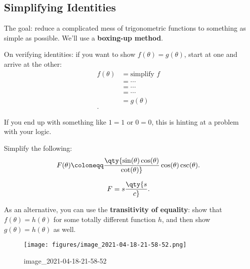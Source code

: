 \hypertarget{simplifying-identities}{%
\subsection{Simplifying Identities}\label{simplifying-identities}}

\begin{remark}

The goal: reduce a complicated mess of trigonometric functions to
something as simple as possible. We'll use a \textbf{boxing-up method}.

\end{remark}

\begin{remark}

On verifying identities: if you want to show \(f(\theta) = g(\theta)\),
start at one and arrive at the other:
\begin{align*}
f(\theta) &= \text{simplify } f \\
&= \cdots \\
&= \cdots \\
&= \cdots \\
&= g(\theta) \\
.\end{align*}

\end{remark}

\begin{warnings}

If you end up with something like \(1=1\) or \(0=0\), this is hinting at
a problem with your logic.

\end{warnings}

\begin{exercise}[?]

Simplify the following:
\begin{align*}
F(\theta) \coloneqq\qty{ \sin(\theta) \cos(\theta) \over \cot(\theta)} \cos(\theta)\csc(\theta)
.\end{align*}

\end{exercise}

\begin{solution}

\begin{align*}
F = s \qty{s \over c}
.\end{align*}

\end{solution}

\begin{remark}

As an alternative, you can use the \textbf{transitivity of equality}:
show that \(f(\theta) = h(\theta)\) for some totally different function
\(h\), and then show \(g(\theta) = h(\theta)\) as well.

\begin{figure}
\centering
\texttt{[image: figures/image\_2021-04-18-21-58-52.png]}
\caption{image\_2021-04-18-21-58-52}
\end{figure}

\end{remark}

